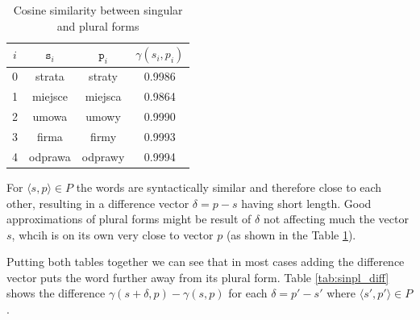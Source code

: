 \documentclass{article}
\begin{document}
  \begin{table}[ht]
  \center
    \begin{tabular}{|c|c|c|c|}
    \hline
    $i$ & $\texttt{s}_i$ & $\texttt{p}_i$ & $\gamma(s_i, p_i)$ \\ \hline
    0 & strata & straty & 0.9986 \\ \hline
    1 & miejsce & miejsca & 0.9864 \\ \hline
    2 & umowa & umowy & 0.9990 \\ \hline
    3 & firma & firmy & 0.9993 \\ \hline
    4 & odprawa & odprawy & 0.9994 \\ \hline
    \end{tabular}
  \caption{Cosine similarity between singular and plural forms}
  \label{tab:sinpl_sim_words}
  \end{table}

  For $\langle s, p \rangle \in P$ the words are syntactically similar and
  therefore close to each other, resulting in a difference vector $\delta = p - s$
  having short length. Good approximations of plural forms might be result of
  $\delta$ not affecting much the vector $s$, whcih is on its own very close to vector $p$
  (as shown in the Table \ref{tab:sinpl_sim_words}).

  Putting both tables together we can see that in most cases adding the difference
  vector puts the word further away from its plural form. Table \ref{tab:sinpl_diff}
  shows the difference $\gamma(s + \delta, p) - \gamma(s, p)$ for each $\delta = p' - s'$
  where $\langle s', p' \rangle \in P$.

  \begin{table}[ht]
  \center
  \caption{Cosine similarity between plural and generated plural forms}
  \label{tab:sinpl_diff}
  \end{table}
\end{document}
